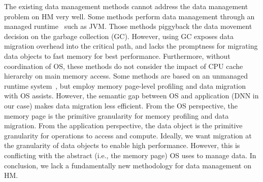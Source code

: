 \textcolor{dong}{The existing data management methods cannot address the data management problem on HM very well. Some methods perform data management through an managed runtime~\cite{pldi19:panthera, pldi18:KG,ASPLOS18:Espresso,sigmetrics19:crystalgazer} such as JVM. Those methods piggyback the data movement decision on the garbage collection (GC). However, using GC exposes data migration overhead into the critical path, and lacks the promptness for migrating data objects to fast memory for best performance. Furthermore, without coordination of OS, these methods do not consider the impact of CPU cache hierarchy on main memory access. 
Some methods are based on an unmanaged runtime system~\cite{Thermostat:asplos17,RAMinate:socc16,heteros:isca17,unimem:sc17,sc18:wu,Yan:ASPLOS19}, but employ memory page-level profiling and data migration with OS assists. However, the semantic gap between OS and application (DNN in our case) makes data migration less efficient. From the OS perspective, the memory page is the primitive granularity for memory profiling and data migration. From the application perspective, the data object is the primitive granularity for operations to access and compute. Ideally, we want migration at the granularity of data objects to enable high performance. However, this is conflicting with the abstract (i.e., the memory page) OS uses to manage data. In conclusion, we lack a fundamentally new methodology for data management on HM.}


